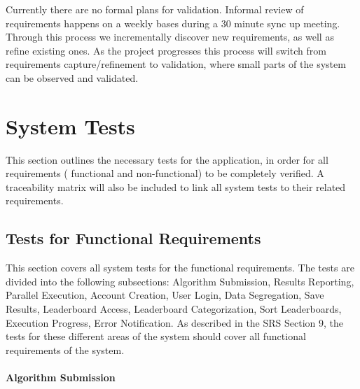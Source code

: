 \documentclass[12pt, titlepage]{article}
\begin{document}
Currently there are no formal plans for validation. Informal review of requirements happens on a weekly bases during a 30 minute sync up meeting. Through this process we incrementally discover new requirements, as well as refine existing ones. As the project progresses this process will switch from requirements capture/refinement to validation, where small parts of the system can be observed and validated.

\section{System Tests}

This section outlines the necessary tests for the application, in order for all requirements ( functional and non-functional) to be completely verified. A traceability matrix will also be included to link all system tests to their related requirements.

\subsection{Tests for Functional Requirements}

This section covers all system tests for the functional requirements. The tests are divided into the following subsections: Algorithm Submission, Results Reporting, Parallel Execution, Account Creation, User Login, Data Segregation, Save Results, Leaderboard Access, Leaderboard Categorization, Sort Leaderboards, Execution Progress, Error Notification. As described in the SRS Section 9, the tests for these different areas of the system should cover all functional requirements of the system.
		
\paragraph{Algorithm Submission}
\end{document}

